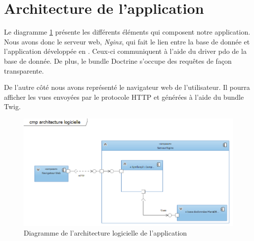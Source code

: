 \section{Architecture de l'application}

Le diagramme \ref{fig::archi_logicielle} présente les différents éléments qui composent notre application. Nous avons donc le serveur web, \textit{Nginx}, qui fait le lien entre la base de donnée \mdb et l'application développée en \symfony. Ceux-ci communiquent à l'aide du driver pdo de la base de donnée. De plus, le bundle Doctrine s'occupe des requêtes \sql de façon transparente.

De l'autre côté nous avons représenté le navigateur web de l'utilisateur. Il pourra afficher les vues envoyées par le protocole HTTP et générées à l'aide du bundle Twig.

\begin{figure}[h!]
	\centering
	\includegraphics[scale=0.7]{ArchitectureLogicielle/archi_logicielle2.PNG}
	\caption{Diagramme de l'architecture logicielle de l'application}
	\label{fig::archi_logicielle}
\end{figure}